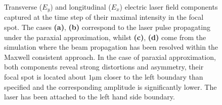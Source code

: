 \begin{figure}[t]
	\hspace{2mm}
	\caption{Transverse ($ E_{y} $) and longitudinal ($ E_{x} $) electric laser field components captured at the time step of their maximal intensity in the focal spot. The cases \textbf{(a)}, \textbf{(b)} correspond to the laser pulse propagating under the paraxial approximation, whilst \textbf{(c)}, \textbf{(d)} come from the simulation where the beam propagation has been resolved within the Maxwell consistent approach. In the case of paraxial approximation, both components reveal strong distortions and asymmetry, their focal spot is located about $ \mathrm{1 \mu m} $ closer to the left boundary than specified and the corresponding amplitude is significantly lower. The laser has been attached to the left hand side boundary.}
	\label{fig:1}
\end{figure}

